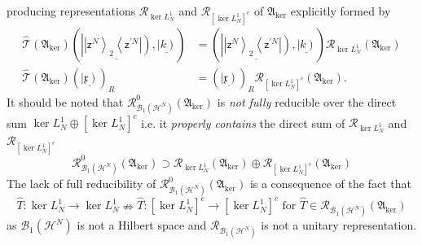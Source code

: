 \documentclass[aps,preprint]{revtex4}%
\begin{document}
producing representations $\mathcal{R}_{\ker L_{N}^{1}}$ and $\mathcal{R}%
_{\left[  \ker L_{N}^{1}\right]  ^{c}}$ of $\mathfrak{A}_{\ker}$ explicitly
formed by%
\begin{align}
\mathcal{\hat{T}}\left(  \mathfrak{A}_{\ker}\right)  \left(  \underline
{\left\vert \left\vert \mathsf{z}^{N}\right\rangle _{2}\left\langle
\mathsf{z}^{\prime N}\right\vert \right)  },\underline{\left\vert k\right)
}\right)   &  =\left(  \underline{\left\vert \left\vert \mathsf{z}%
^{N}\right\rangle _{2}\left\langle \mathsf{z}^{\prime N}\right\vert \right)
},\underline{\left\vert k\right)  }\right)  \mathcal{R}_{\ker L_{N}^{1}%
}\left(  \mathfrak{A}_{\ker}\right) \nonumber\\
\mathcal{\hat{T}}\left(  \mathfrak{A}_{\ker}\right)  \left(  \underline
{\left\vert \mathfrak{x}\right)  }\right)  _{R}  &  =\left(  \underline
{\left\vert \mathfrak{x}\right)  }\right)  _{R}\mathcal{R}_{\left[  \ker
L_{N}^{1}\right]  ^{c}}\left(  \mathfrak{A}_{\ker}\right)  .
\end{align}
It should be noted that $\mathcal{R}_{\mathcal{B}_{1}\left(  \mathcal{H}%
^{N}\right)  }^{0}\left(  \mathfrak{A}_{\ker}\right)  $ is \emph{not fully}
reducible over the direct sum $\ker L_{N}^{1}\oplus\left[  \ker L_{N}%
^{1}\right]  ^{c}$ i.e. it \emph{properly contains} the direct sum of
$\mathcal{R}_{\ker L_{N}^{1}}$ and $\mathcal{R}_{\left[  \ker L_{N}%
^{1}\right]  ^{c}}$
\begin{equation}
\mathcal{R}_{\mathcal{B}_{1}\left(  \mathcal{H}^{N}\right)  }^{0}\left(
\mathfrak{A}_{\ker}\right)  \supset\mathcal{R}_{\ker L_{N}^{1}}\left(
\mathfrak{A}_{\ker}\right)  \oplus\mathcal{R}_{\left[  \ker L_{N}^{1}\right]
^{c}}\left(  \mathfrak{A}_{\ker}\right)
\end{equation}
The lack of full reducibility of $\mathcal{R}_{\mathcal{B}_{1}\left(
\mathcal{H}^{N}\right)  }^{0}\left(  \mathfrak{A}_{\ker}\right)  $ is a
consequence of the fact that
\begin{equation}
\hat{T}:\ker L_{N}^{1}\rightarrow\ker L_{N}^{1}\nRightarrow\hat{T}:\left[
\ker L_{N}^{1}\right]  ^{c}\rightarrow\left[  \ker L_{N}^{1}\right]
^{c}\text{ for }\hat{T}\in\mathcal{R}_{\mathcal{B}_{1}\left(  \mathcal{H}%
^{N}\right)  }\left(  \mathfrak{A}_{\ker}\right)
\end{equation}
as $\mathcal{B}_{1}\left(  \mathcal{H}^{N}\right)  $ is not a Hilbert space
and $\mathcal{R}_{\mathcal{B}_{1}\left(  \mathcal{H}^{N}\right)  }$ is not a
unitary representation.
\end{document}
